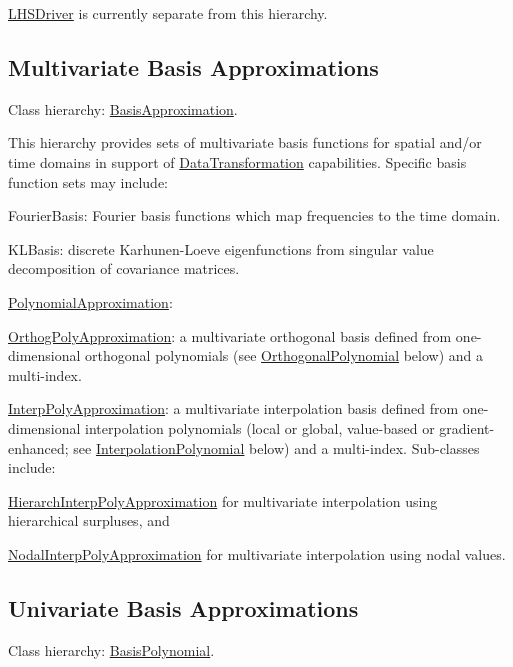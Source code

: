 \hyperlink{classPecos_1_1LHSDriver}{L\+H\+S\+Driver} is currently separate from this hierarchy.\hypertarget{index_DevNDBasis}{}\subsection{Multivariate Basis Approximations}\label{index_DevNDBasis}
Class hierarchy\+: \hyperlink{classPecos_1_1BasisApproximation}{Basis\+Approximation}.

This hierarchy provides sets of multivariate basis functions for spatial and/or time domains in support of \hyperlink{classPecos_1_1DataTransformation}{Data\+Transformation} capabilities. Specific basis function sets may include\+:


\begin{DoxyItemize}
\item Fourier\+Basis\+: Fourier basis functions which map frequencies to the time domain. 
\item K\+L\+Basis\+: discrete Karhunen-\/\+Loeve eigenfunctions from singular value decomposition of covariance matrices. 
\item \hyperlink{classPecos_1_1PolynomialApproximation}{Polynomial\+Approximation}\+: 
\begin{DoxyItemize}
\item \hyperlink{classPecos_1_1OrthogPolyApproximation}{Orthog\+Poly\+Approximation}\+: a multivariate orthogonal basis defined from one-\/dimensional orthogonal polynomials (see \hyperlink{classPecos_1_1OrthogonalPolynomial}{Orthogonal\+Polynomial} below) and a multi-\/index. 
\item \hyperlink{classPecos_1_1InterpPolyApproximation}{Interp\+Poly\+Approximation}\+: a multivariate interpolation basis defined from one-\/dimensional interpolation polynomials (local or global, value-\/based or gradient-\/enhanced; see \hyperlink{classPecos_1_1InterpolationPolynomial}{Interpolation\+Polynomial} below) and a multi-\/index. Sub-\/classes include\+: 
\begin{DoxyItemize}
\item \hyperlink{classPecos_1_1HierarchInterpPolyApproximation}{Hierarch\+Interp\+Poly\+Approximation} for multivariate interpolation using hierarchical surpluses, and 
\item \hyperlink{classPecos_1_1NodalInterpPolyApproximation}{Nodal\+Interp\+Poly\+Approximation} for multivariate interpolation using nodal values. 
\end{DoxyItemize}
\end{DoxyItemize}
\end{DoxyItemize}\hypertarget{index_Dev1DBasis}{}\subsection{Univariate Basis Approximations}\label{index_Dev1DBasis}
Class hierarchy\+: \hyperlink{classPecos_1_1BasisPolynomial}{Basis\+Polynomial}.

